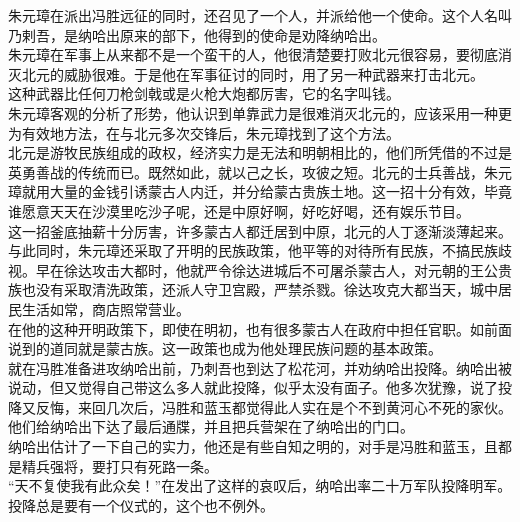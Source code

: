 \begin{multicols}{\theparacolNo}
朱元璋在派出冯胜远征的同时，还召见了一个人，并派给他一个使命。这个人名叫乃剌吾，是纳哈出原来的部下，他得到的使命是劝降纳哈出。\\

朱元璋在军事上从来都不是一个蛮干的人，他很清楚要打败北元很容易，要彻底消灭北元的威胁很难。于是他在军事征讨的同时，用了另一种武器来打击北元。\\

这种武器比任何刀枪剑戟或是火枪大炮都厉害，它的名字叫钱。\\

朱元璋客观的分析了形势，他认识到单靠武力是很难消灭北元的，应该采用一种更为有效地方法，在与北元多次交锋后，朱元璋找到了这个方法。\\

北元是游牧民族组成的政权，经济实力是无法和明朝相比的，他们所凭借的不过是英勇善战的传统而已。既然如此，就以己之长，攻彼之短。北元的士兵善战，朱元璋就用大量的金钱引诱蒙古人内迁，并分给蒙古贵族土地。这一招十分有效，毕竟谁愿意天天在沙漠里吃沙子呢，还是中原好啊，好吃好喝，还有娱乐节目。\\

这一招釜底抽薪十分厉害，许多蒙古人都迁居到中原，北元的人丁逐渐淡薄起来。\\

与此同时，朱元璋还采取了开明的民族政策，他平等的对待所有民族，不搞民族歧视。早在徐达攻击大都时，他就严令徐达进城后不可屠杀蒙古人，对元朝的王公贵族也没有采取清洗政策，还派人守卫宫殿，严禁杀戮。徐达攻克大都当天，城中居民生活如常，商店照常营业。\\

在他的这种开明政策下，即使在明初，也有很多蒙古人在政府中担任官职。如前面说到的道同就是蒙古族。这一政策也成为他处理民族问题的基本政策。\\

就在冯胜准备进攻纳哈出前，乃刺吾也到达了松花河，并劝纳哈出投降。纳哈出被说动，但又觉得自己带这么多人就此投降，似乎太没有面子。他多次犹豫，说了投降又反悔，来回几次后，冯胜和蓝玉都觉得此人实在是个不到黄河心不死的家伙。他们给纳哈出下达了最后通牒，并且把兵营架在了纳哈出的门口。\\

纳哈出估计了一下自己的实力，他还是有些自知之明的，对手是冯胜和蓝玉，且都是精兵强将，要打只有死路一条。\\

“天不复使我有此众矣！”在发出了这样的哀叹后，纳哈出率二十万军队投降明军。\\

投降总是要有一个仪式的，这个也不例外。\\


\end{multicols}
